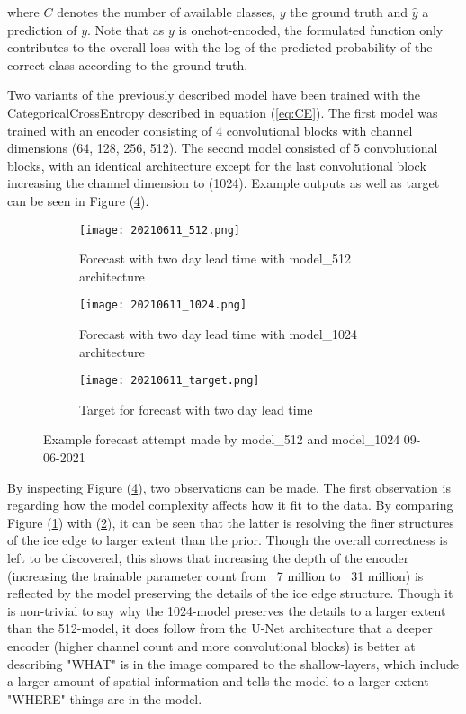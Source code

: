 \documentclass[../main/thesis]{subfiles}
\begin{document}
where $C$ denotes the number of available classes, $y$ the ground truth and $\hat{y}$ a prediction of $y$. Note that as $y$ is onehot-encoded, the formulated function only contributes to the overall loss with the log of the predicted probability of the correct class according to the ground truth.

Two variants of the previously described model have been trained with the CategoricalCrossEntropy described in equation (\ref{eq:CE}). The first model was trained with an encoder consisting of 4 convolutional blocks with channel dimensions (64, 128, 256, 512). The second model consisted of 5 convolutional blocks, with an identical architecture except for the last convolutional block increasing the channel dimension to (1024). Example outputs as well as target can be seen in Figure (\ref{fig:20210611}).

\begin{figure}
    \begin{subfigure}{0.49\textwidth}
        \texttt{[image: 20210611\_512.png]}
        \caption{\label{fig:model51220210611}Forecast with two day lead time with model\_512 architecture}
    \end{subfigure}
    \hfill
    \begin{subfigure}{0.49\textwidth}
        \texttt{[image: 20210611\_1024.png]}
        \caption{\label{fig:model102420210611}Forecast with two day lead time with model\_1024 architecture}
    \end{subfigure}
    \begin{subfigure}{\textwidth}
        \texttt{[image: 20210611\_target.png]}
        \caption{\label{fig:target20210611}Target for forecast with two day lead time}
    \end{subfigure}
       \caption{\label{fig:20210611}Example forecast attempt made by model\_512 and model\_1024 09-06-2021}
\end{figure}

By inspecting Figure (\ref{fig:20210611}), two observations can be made. The first observation is regarding how the model complexity affects how it fit to the data. By comparing Figure (\ref{fig:model51220210611}) with (\ref{fig:model102420210611}), it can be seen that the latter is resolving the finer structures of the ice edge to larger extent than the prior. Though the overall correctness is left to be discovered, this shows that increasing the depth of the encoder (increasing the trainable parameter count from ~7 million to ~31 million) is reflected by the model preserving the details of the ice edge structure. Though it is non-trivial to say why the 1024-model preserves the details to a larger extent than the 512-model, it does follow from the U-Net architecture that a deeper encoder (higher channel count and more convolutional blocks) is better at describing "WHAT" is in the image compared to the shallow-layers, which include a larger amount of spatial information and tells the model to a larger extent "WHERE" things are in the model. 
\end{document}
